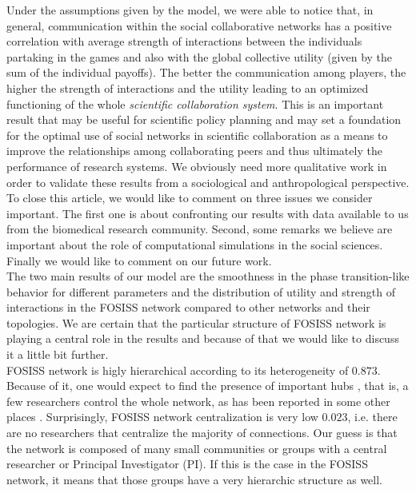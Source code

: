 \documentclass[11pt]{article}
\begin{document}
{\color{red}Under the assumptions given by the model, we were able to notice
  that, in general, communication within the social
collaborative networks has a positive correlation with average strength of interactions between the individuals partaking in the games and
also with the global collective utility (given by the sum of the individual payoffs). The better the
communication among players, the higher the strength of interactions and the utility leading to an optimized functioning of the whole
\emph{scientific collaboration system}. This is an important result that may be useful for scientific policy planning
and may set a foundation for the optimal use of social networks in scientific collaboration as a means to improve the
relationships among collaborating peers and thus ultimately the performance of research systems. 
We obviously need more qualitative work in order to validate these results from a sociological and anthropological
perspective.\\ %

{\color{red}To close this article, we would like to comment on three issues we consider important. The first one is about
confronting our results with data available to us from the biomedical research community. Second, some remarks we believe are important
about the role of computational simulations in the social sciences. Finally we would like to comment on our
future work.}\\


{\color{red}The two main results of our model are the smoothness in the phase transition-like behavior for different parameters and the distribution of utility and strength of interactions in the FOSISS network compared to other networks and their topologies. We are certain that the particular structure of FOSISS network is playing a central role in the results and because of that we would like to discuss it a little bit further.}\\

{\color{red}FOSISS network is higly hierarchical according to its heterogeneity of $0.873$. Because of it, one would
  expect to find the presence of important hubs \cite{Wu-etal2008}, that is, a few researchers control the whole
  network, as has been reported in some other places \cite{yousefi-etal2008}. Surprisingly, FOSISS network
  centralization is very low $0.023$, i.e. there are no researchers that centralize the majority of connections. Our
  guess is that the network is composed of many small communities or groups with a central researcher or Principal
  Investigator (PI). If this is the case in the FOSISS network, it means that those groups have a very hierarchic structure as well.}\\

}
\end{document}
